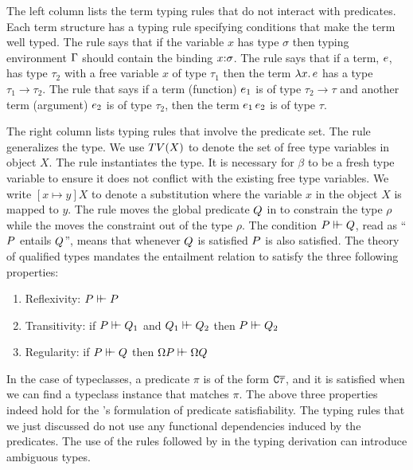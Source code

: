 \documentclass[format=acmsmall,manuscript,screen,nonacm,margin=1in,11pt]{acmart}
\begin{document}
The left column lists the term typing rules that do not interact with predicates.
Each term structure has a typing rule specifying conditions that make the term well typed.
The rule  says that if the variable $x$ has type $\sigma$ then
typing environment $\Gamma$ should contain the binding $x{:}\sigma$.
The rule \trule{$\I\to$} says that if a term, $e$, has type $\tau_2$
with a free variable $x$ of type $\tau_1$ then the term $\lambda x.\, e$
has a type $\tau_1 \to \tau_2$. The rule \trule{$\E\to$}
that says if a term (function) $e_1$ is of type $\tau_2 \to \tau$
and another term (argument) $e_2$ is of type $\tau_2$, then the term $e_1\,e_2$ is of type $\tau$.

The right column lists typing rules that involve the predicate set.
The rule \trule{$\I\forall$} generalizes the type. We use $TV(X)$ to denote the set of
free type variables in object $X$. The rule \trule{$\E\forall$} instantiates the type.
It is necessary for $\beta$ to be a fresh type variable to ensure it does not conflict with
the existing free type variables. We write $[x \mapsto y]X$ to denote a substitution
where the variable $x$ in the object $X$ is mapped to $y$.
The rule \trule{$\I\then$} moves the global predicate $Q$
in to constrain the type $\rho$ while the \trule{$\E\then$} moves the constraint
out of the type $\rho$. The condition $P\vdash\hspace{-0.7ex}\vdash Q$,
read as ``$P$ entails $Q$'', means that
whenever $Q$ is satisfied $P$ is also satisfied.
The theory of qualified types\cite{jones_qualified_1994} mandates the entailment relation to
satisfy the three following properties:
\begin{enumerate}
\item Reflexivity: $P\vdash\hspace{-0.7ex}\vdash P$
\item Transitivity: if $P\vdash\hspace{-0.7ex}\vdash Q_1$ and $Q_1\vdash\hspace{-0.7ex}\vdash Q_2$
  then $P\vdash\hspace{-0.7ex}\vdash Q_2$
\item Regularity: if $P\vdash\hspace{-0.7ex}\vdash Q$ then $\Omega P\vdash\hspace{-0.7ex}\vdash\Omega Q$
\end{enumerate}
In the case of typeclasses, a predicate $\pi$ is of the form $\texttt{C}\overline{\tau}$, and it is satisfied
when we can find a typeclass instance that matches $\pi$.
The above three properties indeed hold for the \TCFD's formulation of predicate satisfiability.
The typing rules that we just discussed do not use any functional dependencies induced by the predicates.
The use of the rules \trule{$\I\then$} followed by \trule{$\I\forall$} in the typing derivation can introduce
ambiguous types.
\end{document}
